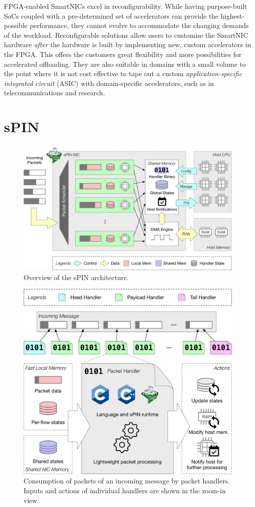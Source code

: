 FPGA-enabled SmartNICs excel in reconfigurability.  While having purpose-built SoCs coupled with a pre-determined set of accelerators can provide the highest-possible performance, they cannot evolve to accommodate the changing demands of the workload.  Reconfigurable solutions allow users to customise the SmartNIC hardware \emph{after} the hardware is built by implementing new, custom accelerators in the FPGA.  This offers the customers great flexibility and more possibilities for accelerated offloading.  They are also suitable in domains with a small volume to the point where it is not cost effective to tape out a custom \emph{application-specific integrated circuit} (ASIC) with domain-specific accelerators, such as in telecommunications and research.

\section{sPIN} \label{sec:background-spin}

\begin{figure}[tp]
    \centering
    \includegraphics[width=.9\textwidth]{thesis/figures/spin-arch.pdf}
    \caption{Overview of the sPIN architecture.}
    \label{fig:spin-arch}
\end{figure}

\begin{figure}[tp]
    \centering
    \includegraphics[width=.8\textwidth]{thesis/figures/spin-handlers.pdf}
    \caption{Consumption of packets of an incoming message by packet handlers.  Inputs and actions of individual handlers are shown in the zoom-in view.} \label{fig:spin-handlers}
\end{figure}

